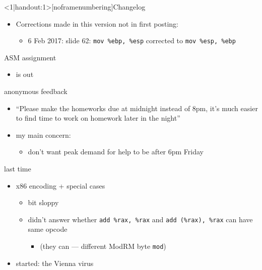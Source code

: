 \begin{frame}
    \titlepage
\end{frame}

{
\begin{frame}<1|handout:1>[noframenumbering]{Changelog}
    \begin{itemize}
        \item Corrections made in this version not in first posting:
        \begin{itemize}
        \item 6 Feb 2017: slide 62: {\tt mov \%ebp, \%esp} corrected to {\tt mov \%esp, \%ebp}
        \end{itemize}
    \end{itemize}
\end{frame}
}

\begin{frame}{ASM assignment}
    \begin{itemize}
    \item is out
    \end{itemize}
\end{frame}

\begin{frame}{anonymous feedback}
    \begin{itemize}
    \item ``Please make the homeworks due at midnight instead of 8pm, it's much easier to find time to work on homework later in the night''
    \item my main concern:
        \begin{itemize}
        \item don't want peak demand for help to be after 6pm Friday
        \end{itemize}
    \end{itemize}
\end{frame}

\begin{frame}{last time}
    \begin{itemize}
    \item x86 encoding + special cases
        \begin{itemize}
        \item bit sloppy
        \item didn't answer whether {\tt add \%rax, \%rax} and {\tt add (\%rax), \%rax} can have same opcode
              \begin{itemize}
              \item (they can --- different ModRM byte {\tt mod})
              \end{itemize}
        \end{itemize}
    \item started: the Vienna virus
    \end{itemize}
\end{frame}

